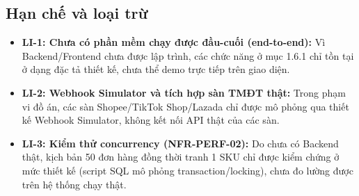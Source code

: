 \subsection{Hạn chế và loại trừ}
\begin{itemize}
    \item \textbf{LI-1: Chưa có phần mềm chạy được đầu-cuối (end-to-end):} Vì Backend/Frontend chưa được lập trình, các chức năng ở mục 1.6.1 chỉ tồn tại ở dạng đặc tả thiết kế, chưa thể demo trực tiếp trên giao diện.
    \item \textbf{LI-2: Webhook Simulator và tích hợp sàn TMĐT thật:} Trong phạm vi đồ án, các sàn Shopee/TikTok Shop/Lazada chỉ được mô phỏng qua thiết kế Webhook Simulator, không kết nối API thật của các sàn.
    \item \textbf{LI-3: Kiểm thử concurrency (NFR-PERF-02):} Do chưa có Backend thật, kịch bản 50 đơn hàng đồng thời tranh 1 SKU chỉ được kiểm chứng ở mức thiết kế (script SQL mô phỏng transaction/locking), chưa đo lường được trên hệ thống chạy thật.
\end{itemize}
